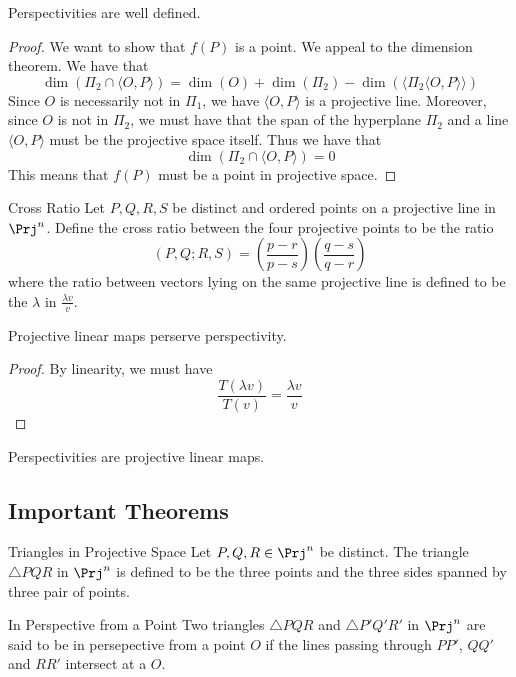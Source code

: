 \begin{lmm}{}{} Perspectivities are well defined. \tcbline
\begin{proof}
We want to show that $f(P)$ is a point. We appeal to the dimension theorem. We have that $$\dim(\Pi_2\cap\langle O,P\rangle)=\dim(O)+\dim(\Pi_2)-\dim(\langle\Pi_2\langle O,P\rangle\rangle)$$ Since $O$ is necessarily not in $\Pi_1$, we have $\langle O,P\rangle$ is a projective line. Moreover, since $O$ is not in $\Pi_2$, we must have that the span of the hyperplane $\Pi_2$ and a line $\langle O,P\rangle$ must be the projective space itself. Thus we have that $$\dim(\Pi_2\cap\langle O,P\rangle)=0$$ This means that $f(P)$ must be a point in projective space. 
\end{proof}
\end{lmm}

\begin{defn}{Cross Ratio}{} Let $P,Q,R,S$ be distinct and ordered points on a projective line in $\Prj^n$. Define the cross ratio between the four projective points to be the ratio $$(P,Q;R,S)=\left(\frac{p-r}{p-s}\right)\left(\frac{q-s}{q-r}\right)$$ where the ratio between vectors lying on the same projective line is defined to be the $\lambda$ in $\frac{\lambda v}{v}$. 
\end{defn}

\begin{prp}{}{} Projective linear maps perserve perspectivity. \tcbline
\begin{proof}
By linearity, we must have $$\frac{T(\lambda v)}{T(v)}=\frac{\lambda v}{v}$$
\end{proof}
\end{prp}

\begin{lmm}{}{} Perspectivities are projective linear maps. 
\end{lmm}

\subsection{Important Theorems}
\begin{defn}{Triangles in Projective Space}{} Let $P,Q,R\in\Prj^n$ be distinct. The triangle $\triangle PQR$ in $\Prj^n$ is defined to be the three points and the three sides spanned by three pair of points. 
\end{defn}

\begin{defn}{In Perspective from a Point}{} Two triangles $\triangle PQR$ and $\triangle P'Q'R'$ in $\Prj^n$ are said to be in persepective from a point $O$ if the lines passing through $PP'$, $QQ'$ and $RR'$ intersect at a $O$. 
\end{defn}

